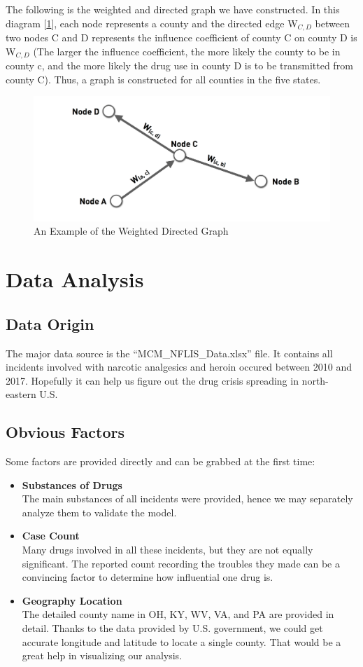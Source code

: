 \documentclass{mcmthesis}
\begin{document}
The following is the weighted and directed graph we have constructed. In this diagram [\ref{graph}], each node represents a county and the directed edge W$_{C,D}$ between two nodes C and D represents the influence coefficient of county C on county D is W$_{C,D}$ (The larger the influence coefficient, the more likely the county to be in county c, and the more likely the drug use in county D is to be transmitted from county C). Thus, a graph is constructed for all counties in the five states.
\begin{figure}[h]
	\centering
	\includegraphics[width=15cm]{figure-release/Model1.ExampleMap.png}
	\caption{An Example of the Weighted Directed Graph}\label{graph}
\end{figure}

\section{Data Analysis}

\subsection{Data Origin}
The major data source is the ``MCM\_NFLIS\_Data.xlsx'' file. It contains all incidents involved with narcotic analgesics and heroin occured between 2010 and 2017. Hopefully it can help us figure out the drug crisis spreading in north-eastern U.S.

\subsection{Obvious Factors}
Some factors are provided directly and can be grabbed at the first time:
\begin{itemize}
	\item \textbf{Substances of Drugs}\\
	The main substances of all incidents were provided, hence we may separately analyze them to validate the model.
	\item \textbf{Case Count}\\
	Many drugs involved in all these incidents, but they are not equally significant. The reported count recording the troubles they made can be a convincing factor to determine how influential one drug is.
	\item \textbf{Geography Location}\\
	The detailed county name in OH, KY, WV, VA, and PA are provided in detail. Thanks to the data provided by U.S. government\cite{3}, we could get accurate longitude and latitude to locate a single county. That would be a great help in visualizing our analysis.
\end{itemize}
\end{document}
